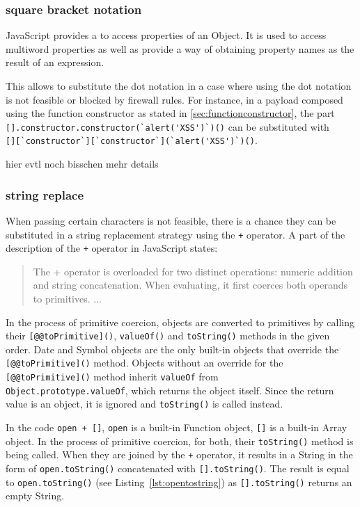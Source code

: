 \subsubsection{square bracket notation}
\label{sec:sbn}
JavaScript provides a  to access properties of an Object. It is used to access multiword properties as well as provide a way of obtaining property names as the result of an expression. \cite{js/brackets}

This  allows to substitute the dot notation in a case where using the dot notation is not feasible or blocked by firewall rules.
For instance, in a payload composed using the function constructor as stated in \ref{sec:functionconstructor}, the part \\ \verb|[].constructor.constructor(`alert('XSS')`)()| can be substituted with \\ \verb|[][`constructor`][`constructor`](`alert('XSS')`)()|.

{\color{red} hier evtl noch bisschen mehr details}


\subsubsection{string replace}
\label{sec:stringreplace}
When passing certain characters is not feasible, there is a chance they can be substituted in a string replacement strategy using the \verb|+| operator.
A part of the description of the \verb|+| operator in JavaScript states:
\begin{quote}
	The + operator is overloaded for two distinct operations: numeric addition and string concatenation. When evaluating, it first coerces both operands to primitives. ... \cite{js/+}
\end{quote}
In the process of primitive coercion, objects are converted to primitives by calling their \verb|[@@toPrimitive]()|, \verb|valueOf()| and \verb|toString()| methods in the given order. Date and Symbol objects are the only built-in objects that override the \verb|[@@toPrimitive]()| method.
Objects without an override for the \verb|[@@toPrimitive]()| method inherit \verb|valueOf| from
\\ \verb|Object.prototype.valueOf|, which returns the object itself.
Since the return value is an object, it is ignored and \verb|toString()| is called instead. \cite{js/primitiveCoercion}

In the code \verb|open + []|, \verb|open| is a built-in Function object, \verb|[]| is a built-in Array object.
In the process of primitive coercion, for both, their \verb|toString()| method is being called.
When they are joined by the \verb|+| operator, it results in a String in the form of \verb|open.toString()| concatenated with \verb|[].toString()|. The result is equal to \verb|open.toString()| (see Listing~\ref{lst:opentostring}) as \verb|[].toString()| returns an empty String.

